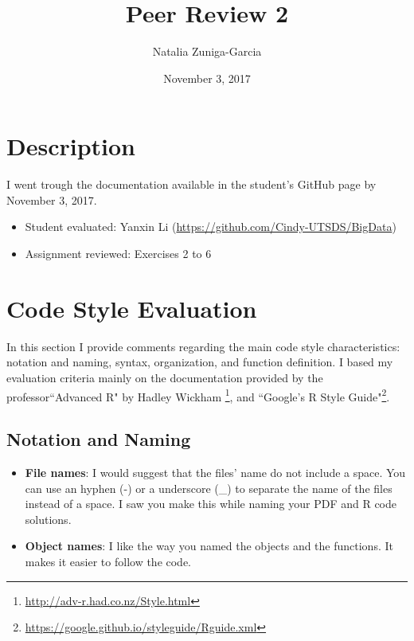 \documentclass[11 pt]{article}
\author{Natalia Zuniga-Garcia}
\title{Peer Review 2}
\date{November 3, 2017}
\begin{document}
\maketitle

\section{Description}

I went trough the documentation available in the student's GitHub page by November 3, 2017.

\begin{itemize}
	\item Student evaluated:  Yanxin Li (\url{https://github.com/Cindy-UTSDS/BigData})
	\item Assignment reviewed: Exercises 2 to 6


\end{itemize}
	
\section{Code Style Evaluation}
In this section I provide comments regarding the main code style characteristics: notation and naming, syntax, organization, and function definition. I based my evaluation criteria mainly on the documentation provided by the professor``Advanced R" by Hadley Wickham \footnote{\url{http://adv-r.had.co.nz/Style.html}}, and ``Google's R Style Guide"\footnote{\url{https://google.github.io/styleguide/Rguide.xml}}. 

\subsection{Notation and Naming}
\begin{itemize}
	\item \textbf{File names}: I would suggest that the files' name do not include a space. You can use an hyphen (-) or a underscore (\_) to separate the name of the files instead of a space. I saw you make this while naming your PDF and R code solutions.
	\item \textbf{Object names}: I like the way you named the objects and the functions. It makes it easier to follow the code.
\end{itemize}
\end{document}

